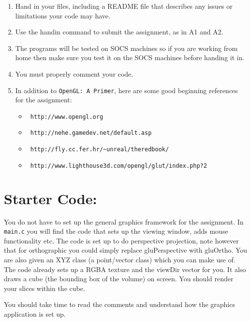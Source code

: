 \documentclass[12pt]{article}
\begin{document}
\begin{enumerate}
\item Hand in your files, including a README file that describes
any issues or limitations your code may have.
\item Use the handin command to submit the assignment, as in A1 and A2.
\item The programs will be tested on SOCS machines so if you are
  working from home then make sure you test it on the SOCS machines
  before handing it in.
\item You must properly comment your code.  
\item In addition to {\tt OpenGL: A Primer}, here are some good beginning references for the assignment: 
\begin{itemize}
\item  \begin{verbatim} http://www.opengl.org \end{verbatim}
\item  \begin{verbatim} http://nehe.gamedev.net/default.asp \end{verbatim}
\item  \begin{verbatim} http://fly.cc.fer.hr/~unreal/theredbook/ \end{verbatim}
\item  \begin{verbatim} http://www.lighthouse3d.com/opengl/glut/index.php?2 \end{verbatim}
\end{itemize}
\end{enumerate}


\section*{Starter Code:}
You do not have to set up the general graphics framework for the
assignment. In {\tt main.c} you will find the code that sets up the viewing window, adds mouse functionality etc. The code is set up to do perspective projection, note however that for orthographic you could simply replace gluPerspective with gluOrtho. 
You are also given an XYZ class (a point/vector class) which you can make use of.  The code already sets up a RGBA texture and the viewDir vector for you.  It also draws a cube (the bounding box of the volume) on screen. You should render your slices within the cube. 

You should take time to read the comments and understand how the graphics application is set up.
\end{document}
